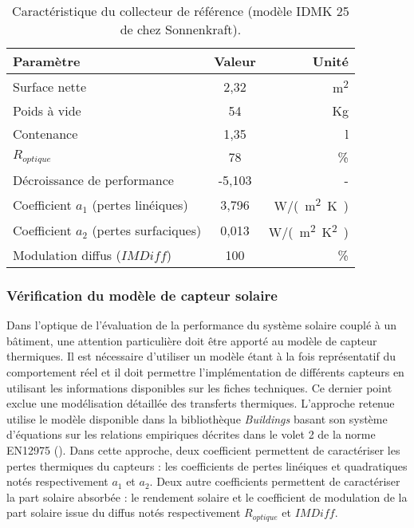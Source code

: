 \begin{table}
\centering
\begin{tabular}{lcr}
    \toprule
    Paramètre                                & Valeur         & Unité                 \\
    \midrule
    Surface nette                            & 2,32           & \si{m^{2}}            \\
    Poids à vide                             & 54             & \si{Kg}               \\
    Contenance                               & 1,35           & \si{l}                \\
    $R_{optique}$                            & 78             & \si{\%}               \\
    Décroissance de performance              & -5,103         & -                     \\
    Coefficient $a_{1}$ (pertes linéiques)   & 3,796          & \si{W/(m^{2}.K)}      \\
    Coefficient $a_{2}$ (pertes surfaciques) & 0,013          & \si{W/(m^{2}.K^{2})}  \\
    Modulation diffus ($IMDiff$)             & 100            & \si{\%}               \\
    \bottomrule
\end{tabular}
\caption{Caractéristique du collecteur de référence (modèle IDMK 25 de chez Sonnenkraft).
         \label{tab:idmk_specs}}
\end{table}


\subsubsection{Vérification du modèle de capteur solaire} %
\label{ssub:verification_du_modele_de_capteur_solaire}
Dans l’optique de l’évaluation de la performance  du système solaire couplé à un bâtiment, une
attention particulière doit être apporté au modèle de capteur thermiques. Il est
nécessaire d’utiliser un modèle étant à la fois représentatif du comportement réel
et il doit permettre l’implémentation de différents capteurs en utilisant les informations
disponibles sur les fiches techniques. Ce dernier point exclue une modélisation détaillée
des transferts thermiques. L’approche retenue utilise le modèle disponible dans la
bibliothèque \textit{Buildings} basant son système d’équations sur les relations
empiriques décrites dans le volet 2 de la norme EN12975 ().
Dans cette approche, deux coefficient
permettent de caractériser les pertes thermiques du capteurs : les coefficients de pertes linéiques
et quadratiques notés respectivement $a_{1}$ et $a_{2}$. Deux autre coefficients permettent de
caractériser la part solaire absorbée :  le rendement solaire et le coefficient de modulation
de la part solaire issue du diffus notés respectivement $R_{optique}$ et $IMDiff$.

